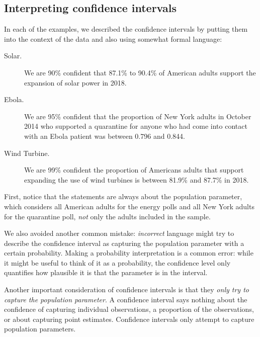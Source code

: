 \subsection{Interpreting confidence intervals}
\label{interpretingCIs}


In each of the examples, we described the confidence
intervals by putting them into the context of the data and also
using somewhat formal language:
\begin{description}
  \item[Solar.] We are 90\% confident that 87.1\% to 90.4\% of
      American adults support the expansion of solar power in 2018.
  \item[Ebola.] We are 95\% confident that the proportion
      of New York adults in October 2014 who supported a quarantine
      for anyone who had come into contact with an Ebola patient was
      between 0.796 and 0.844.
  \item[Wind Turbine.] We are 99\% confident the proportion of
      Americans adults that support expanding the use of wind
      turbines is between 81.9\% and 87.7\% in 2018.
\end{description}
First, notice that the statements are always about the population
parameter, which considers all American adults for the energy polls
and all New York adults for the quarantine poll, \emph{not} only
the adults included in the sample.

We also avoided another common mistake:
\emph{incorrect} language might try to describe the confidence interval
as capturing the population parameter with a certain probability.
Making a probability interpretation is a common error:
while it might be useful to think of it as a probability,
the confidence level only quantifies how plausible
it is that the parameter is in the interval.

Another important consideration of confidence intervals is that they
\emph{only try to capture the population parameter}. A confidence
interval says nothing about the confidence of capturing individual
observations, a proportion of the observations, or about capturing
point estimates. Confidence intervals only attempt to capture
population parameters.




